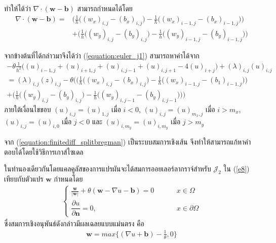 ทำให้ได้ว่า $\nabla \cdot (\boldsymbol{w}-\boldsymbol{b})$ สามารถกำหนดได้โดย
\begin{align}
	\nonumber \nabla \cdot (\boldsymbol{w}-\boldsymbol{b}) = &\bigg( \frac{1}{h} \Big((w_x)_{i,j}-(b_x)_{i,j}\Big) - \frac{1}{h} \Big((w_x)_{i-1,j}-(b_x)_{i-1,j}\Big) \bigg) \\ 
	&+ \bigg( \frac{1}{h} \Big((w_y)_{i,j}-(b_y)_{i,j}\Big) - \frac{1}{h} \Big((w_y)_{i-1,j}-(b_y)_{i-1,j}\Big) \bigg)
\end{align}

จากข้างต้นที่ได้กล่าวมาจึงได้ว่า (\ref{equation:euler_j1})  สามารถหาค่าได้จาก 
\begin{align}
	\nonumber - \theta \frac{1}{h^2}\Big( (u)_{i-1,j} + (u)_{i+1,j} + (u)_{i,j-1} + (u)_{i,j+1} - 4(u)_{i+j} \Big) + (\lambda)_{i,j} (u)_{i,j} \\ \nonumber = (\lambda)_{i,j} (z)_{i,j} - \theta \Bigg( \bigg( \frac{1}{h} \Big((w_x)_{i,j}-(b_x)_{i,j}\Big) - \frac{1}{h} \Big((w_x)_{i-1,j}-(b_1)_{i-1,j}\Big) \bigg) \\ + \bigg( \frac{1}{h} \Big((w_y)_{i,j}-(b_y)_{i,j} \Big) - \frac{1}{h} \Big((w_y)_{i,j-1}-(b_y)_{i,j-1} \Big) \bigg) \Bigg)
	\label{equation:finitediff_splitbregman}
\end{align}
ภายใต้เงื่อนไขขอบ $(u)_{i,j} = (u)_{1,j}$ เมื่อ $i < 0$, $(u)_{i,j} = (u)_{m_x,j}$ เมื่อ $i > m_x$, $(u)_{i,j} = (u)_{i,0}$ เมื่อ $j < 0$ และ $(u)_{i,m_y} = (u)_{i,m_y}$ เมื่อ $j > m_y$ 

\hspace{1cm} จาก (\ref{equation:finitediff_splitbregman}) เป็นระบบสมการเชิงเส้น จึงทำให้สามารถแก้หาคำตอบได้โดยใช้วิธีการเกาส์ไซเดล


\hspace{1cm} ในทำนองเดียวกันโดยแคลคูลัสของการแปรผันจะได้สมการออยเลอร์ลากราจ์สำหรับ $\mathcal{J}_2$ ใน (\ref{e8}) เทียบกับตัวแปร $\boldsymbol{w}$ กำหนดโดย
\begin{align}
	\left \{ \begin{array}{ll} 	\frac{\boldsymbol{w}}{|\boldsymbol{w}|} + \theta(\boldsymbol{w}-\nabla u-\boldsymbol{b}) = 0   & \hspace{1cm} x \in \Omega \\
	\dfrac{\partial u}{\partial \boldsymbol{n}} = 0, & \hspace{1cm} x \in \partial \Omega \end{array} \right .
\end{align}
ซึ่งสมการเชิงอนุพันธ์ดังกล่าวมีผลเฉลยแบบแม่นตรง \cite{ref:splitbergman-inpaint} คือ 
\begin{align}
	\boldsymbol{w} = max\bigg\{(\nabla u + \boldsymbol{b}) - \frac{1}{\theta},0\bigg\}
	\label{equation:euler_w_exact}
\end{align}
